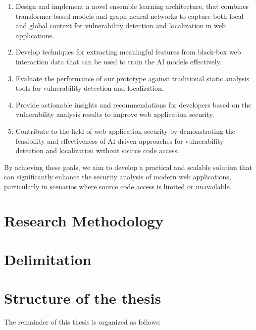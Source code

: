 \begin{enumerate}

\item Design and implement a novel ensemble learning architecture, that combines transformer-based models and graph neural networks to capture both local and global context for vulnerability detection and localization in web applications.

\item Develop techniques for extracting meaningful features from black-box web interaction data that can be used to train the AI models effectively.

\item Evaluate the performance of our prototype against traditional static analysis tools for vulnerability detection and localization.

\item Provide actionable insights and recommendations for developers based on the vulnerability analysis results to improve web application security.

\item Contribute to the field of web application security by demonstrating the feasibility and effectiveness of AI-driven approaches for vulnerability detection and localization without source code access.

\end{enumerate}

By achieving these goals, we aim to develop a practical and scalable solution that can significantly enhance the security analysis of modern web applications, particularly in scenarios where source code access is limited or unavailable.

\section{Research Methodology}


\section{Delimitation}


\section{Structure of the thesis}
The remainder of this thesis is organized as follows:

